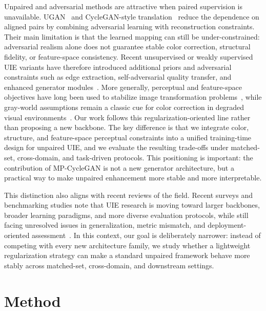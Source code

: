 \documentclass[final,1p,times]{elsarticle}
\begin{document}
Unpaired and adversarial methods are attractive when paired supervision is unavailable. UGAN~\cite{fabbri2018ugan} and CycleGAN-style translation~\cite{zhu2017cyclegan} reduce the dependence on aligned pairs by combining adversarial learning with reconstruction constraints. Their main limitation is that the learned mapping can still be under-constrained: adversarial realism alone does not guarantee stable color correction, structural fidelity, or feature-space consistency. Recent unsupervised or weakly supervised UIE variants have therefore introduced additional priors and adversarial constraints such as edge extraction, self-adversarial quality transfer, and enhanced generator modules~\cite{jia2024unsupervised,wang2024sagan}. More generally, perceptual and feature-space objectives have long been used to stabilize image transformation problems~\cite{johnson2016perceptual}, while gray-world assumptions remain a classic cue for color correction in degraded visual environments~\cite{buchsbaum1980grayworld}. Our work follows this regularization-oriented line rather than proposing a new backbone. The key difference is that we integrate color, structure, and feature-space perceptual constraints into a unified training-time design for unpaired UIE, and we evaluate the resulting trade-offs under matched-set, cross-domain, and task-driven protocols. This positioning is important: the contribution of MP-CycleGAN is not a new generator architecture, but a practical way to make unpaired enhancement more stable and more interpretable.

This distinction also aligns with recent reviews of the field. Recent surveys and benchmarking studies note that UIE research is moving toward larger backbones, broader learning paradigms, and more diverse evaluation protocols, while still facing unresolved issues in generalization, metric mismatch, and deployment-oriented assessment~\cite{cong2024survey,lai2025review,shen2025uiqe,liu2024uiqa}. In this context, our goal is deliberately narrower: instead of competing with every new architecture family, we study whether a lightweight regularization strategy can make a standard unpaired framework behave more stably across matched-set, cross-domain, and downstream settings.

\section{Method}
\end{document}
